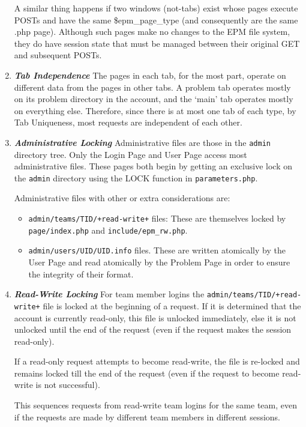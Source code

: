 \documentclass[12pt]{article}
\newcommand{\key}[1]{{\bf \em #1}}
\newcommand{\EOL}{\penalty \exhyphenpenalty}
\begin{document}
\begin{enumerate}
A similar thing happens if two windows (not-tabs)
exist whose pages execute POSTs and have the same
\$epm\_page\_type (and consequently are the same .php page).
Although such pages make no changes to
the EPM file system, they do have session state that must be
managed between their original GET and subsequent POSTs.

\item \key{Tab Independence}
The pages in each
tab, for the most part, operate on different data from the pages
in other tabs.  A problem tab operates mostly on its problem
directory in the account, and the `main' tab operates mostly on
everything else.  Therefore, since there is at most one tab of
each type, by Tab Uniqueness, most requests are independent
of each other.

\item \key{Administrative Locking}
Administrative files are those in the {\tt admin} directory tree.
Only the Login Page and User Page access most administrative files.
These pages both begin by getting an exclusive lock on the
{\tt admin} directory using the LOCK function in {\tt parameters.php}.

Administrative files with other or extra considerations are:
\begin{itemize}
\item {\tt admin/teams/TID/+read-write+} files: These are themselves
locked by {\tt page/\EOL index.php} and {\tt include/\EOL epm\_rw.php}.
\item {\tt admin/users/UID/UID.info} files.  These are written
atomically by the User Page and read atomically by the Problem Page
in order to ensure the integrity of their format.
\end{itemize}

\item \key{Read-Write Locking}
For team member logins the {\tt admin/teams/TID/+read-write+}
file is locked at the beginning of a request.  If it is
determined that the account is currently read-only, this file
is unlocked immediately, else it is not unlocked until the end of the
request (even if the request makes the session read-only).

If a read-only request attempts to become read-write, the file
is re-locked and remains locked till the end of the request
(even if the request to become read-write is not successful).

This sequences requests from read-write team logins for the
same team, even if the requests are made by different team
members in different sessions.


\end{enumerate}
\end{document}
